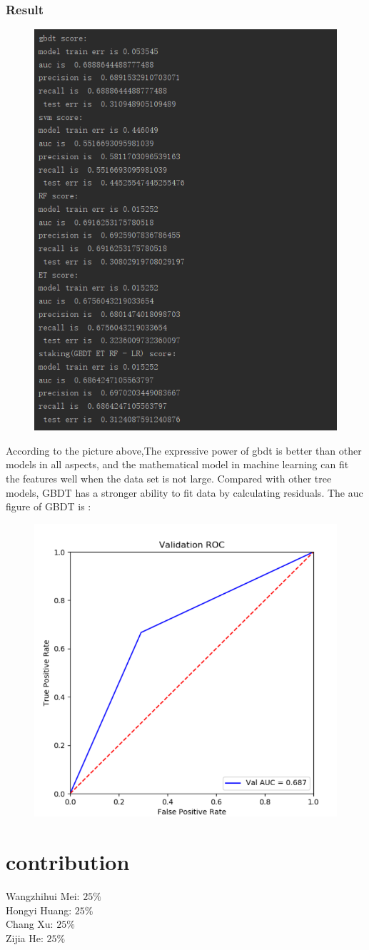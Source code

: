 \documentclass{article}
\begin{document}
 \subsubsection{Result}
    \begin{figure}[H]
\centering
  \includegraphics[width=.8\textwidth]{3-10.png} %
  \end{figure}
According to the picture above,The expressive power of gbdt is better than other models in all aspects, and the mathematical model in machine learning can fit the features well when the data set is not large. Compared with other tree models, GBDT has a stronger ability to fit data by calculating residuals.
The auc figure of GBDT is :
    \begin{figure}[H]
\centering
  \includegraphics[width=.8\textwidth]{3-11.png} %
  \end{figure}

\section{contribution}
Wangzhihui Mei: $25\%$ \\
Hongyi Huang: $25\%$ \\
Chang Xu: $25\%$ \\
Zijia He: $25\%$
\end{document}
